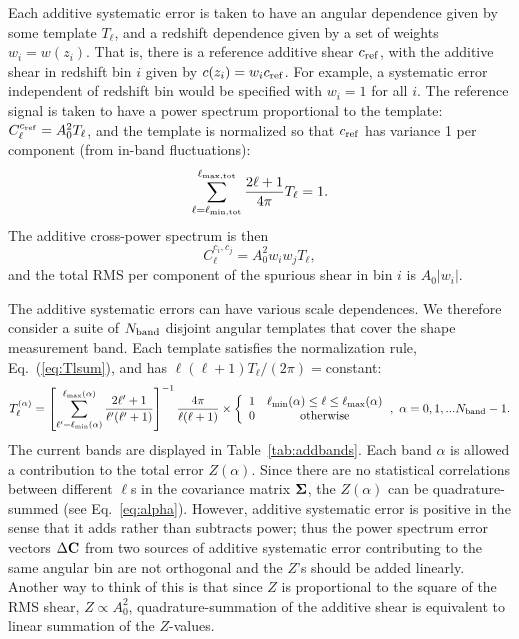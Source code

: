 Each additive systematic error is taken to have an angular dependence given by some template $T_\ell$, and a redshift dependence given by a set of weights $w_i=w(z_i)$. That is, there is a reference additive shear $c_{\rm ref}$, with the additive shear in redshift bin $i$ given by $c(z_i) = w_ic_{\rm ref}$. For example, a systematic error independent of redshift bin would be specified with $w_i=1$ for all $i$. The reference signal is taken to have a power spectrum proportional to the template: $C_\ell^{c_{\rm ref}} = A_0^2T_\ell$, and the template is normalized so that $c_{\rm ref}$ has variance 1 per component (from in-band fluctuations):
\begin{equation}
\sum_{\ell=\ell_{\rm min,tot}}^{\ell_{\rm max,tot}} \frac{2\ell+1}{4\pi} T_\ell = 1.
\label{eq:Tlsum}
\end{equation}
The additive cross-power spectrum is then
\begin{equation}
C_\ell^{c_i,c_j} = A_0^2 w_iw_jT_\ell,
\end{equation}
and the total RMS per component of the spurious shear in bin $i$ is $A_0|w_i|$.

The additive systematic errors can have various scale dependences. We therefore consider a suite of $N_{\rm band}$ disjoint angular templates that cover the shape measurement band. Each template satisfies the normalization rule, Eq.~(\ref{eq:Tlsum}), and has $\ell(\ell+1)T_\ell/(2\pi)=$constant:
\begin{equation}
T_\ell^{(\alpha)} = \left[ \sum_{\ell'=\ell_{\rm min}(\alpha)}^{\ell_{\rm max}(\alpha)} \frac{2\ell'+1}{\ell'(\ell'+1)} \right]^{-1} \frac{4\pi}{\ell(\ell+1)}
\times\left\{ \begin{array}{cc} 1 & \ell_{\rm min}(\alpha)\le\ell\le\ell_{\rm max}(\alpha) \\ 0 & {\rm otherwise} \end{array} \right.\!,~\alpha=0,1,...N_{\rm band}-1.
\end{equation}
The current bands are displayed in Table~\ref{tab:addbands}. Each band $\alpha$ is allowed a contribution to the total error $Z(\alpha)$. Since there are no statistical correlations between different $\ell$s in the covariance matrix ${\bf\Sigma}$, the $Z(\alpha)$ can be quadrature-summed (see Eq.~\ref{eq:alpha}). However, additive systematic error is positive in the sense that it adds rather than subtracts power; thus the power spectrum error vectors $\Delta{\bf C}$ from two sources of additive systematic error contributing to the same angular bin are not orthogonal and the $Z$'s should be added linearly. Another way to think of this is that since $Z$ is proportional to the square of the RMS shear, $Z\propto A_0^2$, quadrature-summation of the additive shear is equivalent to linear summation of the $Z$-values.

